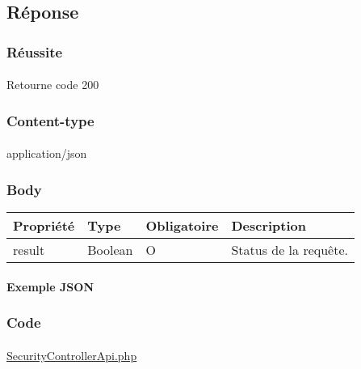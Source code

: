 			\paragraph{}
			

\subsection{Réponse}
	\subsubsection{Réussite}
		\paragraph{}
			Retourne code 200
			
	\subsubsection{Content-type}
		\paragraph{}
			application/json
	
	\subsubsection{Body}
		\begin{center}
			\begin{tabularx}{\textwidth}{| T{0.2122\textwidth} | S{0.22\textwidth} | S{0.15\textwidth} | S{0.3\textwidth} |}
				\hline
				Propriété & Type & Obligatoire & Description \\
				\hline
				result & Boolean & O & Status de la requête. \\
				\hline
			\end{tabularx}
		\end{center}
		
		\vspace{\baselineskip}
		\paragraph{Exemple JSON}
			\paragraph{}
			
			
			
	\subsubsection{Code}
		\paragraph{}
			\href{https://github.com/victorsmits/Aquabike/blob/master/backend/src/Controller/API/SecurityControllerApi.php}{SecurityControllerApi.php}
